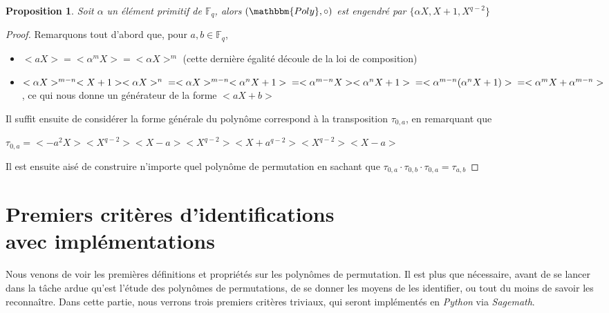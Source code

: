 \documentclass[12pt]{article}
\newcommand{\Fq}{\mathds{F}_q}
\newtheorem{prop}{Proposition}
\theoremstyle{definition}
\begin{document}
\begin{prop}
Soit $\alpha$ un élément primitif de $\Fq$, alors $(\mathbbm{Poly}, \circ)$ est engendré par $\{ \alpha X, X+1, X^{q-2}\}$
\end{prop}

\begin{proof}
Remarquons tout d'abord que, pour $a, b \in \Fq$, 
	\begin{itemize}
		\item $<aX> = <\alpha^mX> = <\alpha X>^m$ (cette dernière égalité découle de la loi de composition)
		\item $<\alpha X>^{m-n}<X+1><\alpha X>^n  \newline
		= <\alpha X>^{m-n}<\alpha^nX + 1> \newline
		= <\alpha^{m-n} X ><\alpha^n X+ 1> \newline
		= <\alpha^{m-n}(\alpha^n X+ 1)> \newline
		= <\alpha^mX+\alpha^{m-n}>$ , ce qui nous donne un générateur de la forme $<aX + b>$
	\end{itemize}
Il suffit ensuite de considérer la forme générale du polynôme correspond à la transposition $\tau_{0,a}$, en remarquant que 
\begin{center} $\tau_{0,a} = <-a^2X><X^{q-2}><X-a><X^{q-2}><X+a^{q-2}><X^{q-2}><X-a>$ \end{center}
Il est ensuite aisé de construire n'importe quel polynôme de permutation en sachant que $\tau_{0,a} \cdot \tau_{0,b} \cdot \tau_{0,a} = \tau_{a,b}$
\end{proof}


\pagebreak

\section{Premiers critères d'identifications\\avec implémentations}
Nous venons de voir les premières définitions et propriétés sur les polynômes de permutation. Il est plus que nécessaire, avant de se lancer dans la tâche ardue qu'est l'étude des polynômes de permutations, de se donner les moyens de les identifier, ou tout du moins de savoir les reconnaître. 
Dans cette partie, nous verrons trois premiers critères triviaux, qui seront implémentés en \textit{Python} via \textit{Sagemath}.
\end{document}
